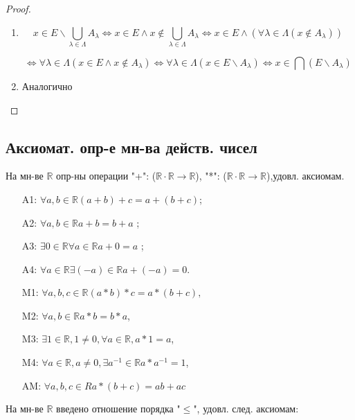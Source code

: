 \documentclass[12pt]{article}
\newcommand{\R}{\mathbb{R}}
\theoremstyle{definition}
\theoremstyle{definition}
\begin{document}
\begin{proof}
~\newline

\begin{enumerate}
    \item 
        \[
            x \in E \backslash \bigcup_{\lambda \in \Lambda} A_\lambda  \iff x \in E \land x \not\in \bigcup_{\lambda \in \Lambda} A_\lambda \iff x \in E \land (\forall \lambda \in \Lambda (x \not\in A_\lambda))
        \]

\[
    \iff \forall \lambda \in \Lambda (x \in E \land x \not\in A_\lambda) \iff \forall \lambda \in \Lambda (x \in E \backslash A_\lambda) \iff x \in \bigcap (E \backslash A_\lambda)
\]
    \item Аналогично
\end{enumerate}

\end{proof}

\subsection{Аксиомат. опр-е мн-ва действ. чисел}

На мн-ве $\R$ опр-ны операции "+": ($\R \cdot \R \rightarrow \R$), "*": ($\R \cdot \R \rightarrow \R$),удовл. аксиомам.

\begin{itemize}
    \item [A1: ] $\forall a, b \in \R (a + b) + c = a + (b + c)$;
    \item [A2: ] $\forall a, b \in \R a + b = b + a$ ;
    \item [A3: ] $\exists 0 \in \R \forall a \in \R a + 0 = a$ ;
    \item [A4: ] $\forall a \in \R \exists (-a) \in \R a + (-a) = 0$.
    \item [M1: ] $\forall a, b, c \in \R (a * b) * c = a * (b + c),$ 
    \item [M2: ] $\forall a, b \in \R a * b = b * a$,
    \item [M3: ] $\exists 1 \in \R, 1 \neq 0, \forall a \in \R, a * 1 = a$,
    \item [M4: ] $\forall a \in \R, a \neq 0, \exists a^{-1} \in \R a * a^{-1} = 1$,
    \item [AM: ] $\forall a, b, c \in R a * (b + c) = ab + ac$
\end{itemize}

На мн-ве $\R$ введено отношение порядка "$\leq$", удовл. след. аксиомам:
\end{document}
